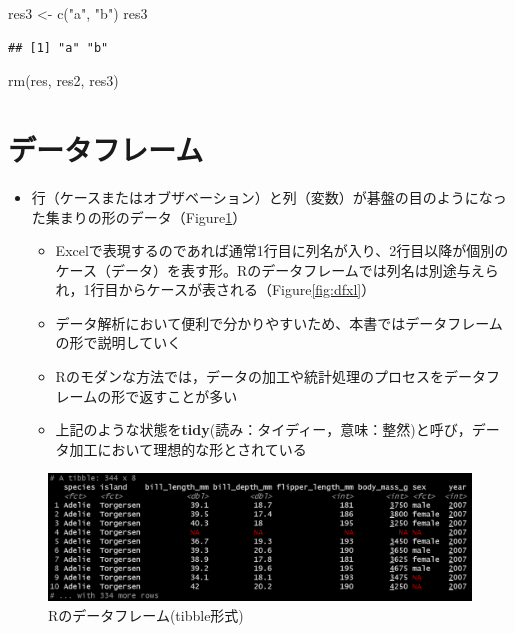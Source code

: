 \documentclass[
  xelatex,ja=standard, b5paper]{bxjsbook}
\newenvironment{Shaded}{\begin{snugshade}}{\end{snugshade}}
\newcommand{\FunctionTok}[1]{\textcolor[rgb]{0.00,0.00,0.00}{#1}}
\newcommand{\NormalTok}[1]{#1}
\newcommand{\OtherTok}[1]{\textcolor[rgb]{0.56,0.35,0.01}{#1}}
\newcommand{\StringTok}[1]{\textcolor[rgb]{0.31,0.60,0.02}{#1}}
\providecommand{\tightlist}{%
  \setlength{\itemsep}{0pt}\setlength{\parskip}{0pt}}
\begin{document}
\begin{Shaded}
\begin{Highlighting}[]
\NormalTok{res3 }\OtherTok{\textless{}{-}} \FunctionTok{c}\NormalTok{(}\StringTok{"a"}\NormalTok{, }\StringTok{"b"}\NormalTok{)}
\NormalTok{res3}
\end{Highlighting}
\end{Shaded}

\begin{verbatim}
## [1] "a" "b"
\end{verbatim}

\begin{Shaded}
\begin{Highlighting}[]
\FunctionTok{rm}\NormalTok{(res, res2, res3)}
\end{Highlighting}
\end{Shaded}

\hypertarget{p-df}{%
\section{データフレーム}\label{p-df}}

\begin{itemize}
\tightlist
\item
  行（ケースまたはオブザベーション）と列（変数）が碁盤の目のようになった集まりの形のデータ（Figure\ref{fig:dfr}）

  \begin{itemize}
  \tightlist
  \item
    Excelで表現するのであれば通常1行目に列名が入り、2行目以降が個別のケース（データ）を表す形。Rのデータフレームでは列名は別途与えられ，1行目からケースが表される（Figure\ref{fig:dfxl}）
  \item
    データ解析において便利で分かりやすいため、本書ではデータフレームの形で説明していく
  \item
    Rのモダンな方法では，データの加工や統計処理のプロセスをデータフレームの形で返すことが多い
  \item
    上記のような状態を\textbf{tidy}(読み：タイディー，意味：整然)と呼び，データ加工において理想的な形とされている
  \end{itemize}
\end{itemize}

\begin{figure}

{\centering \includegraphics[width=0.8\linewidth]{images/dfr} 

}

\caption{Rのデータフレーム(tibble形式)}\label{fig:dfr}
\end{figure}
\end{document}
